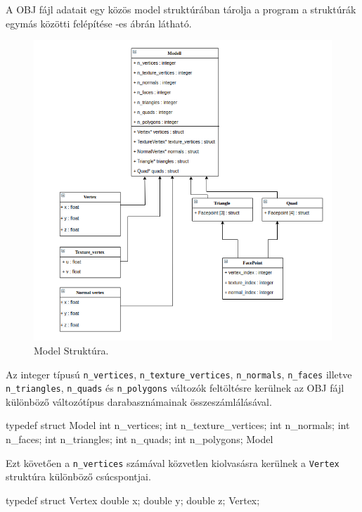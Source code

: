A OBJ fájl adatait egy közös model struktúrában tárolja a program a struktúrák egymás közötti felépítése -es ábrán látható.
\bigskip
\begin{figure}[h]
\centering
\includegraphics[width=\textwidth]{images/struct.png}
\caption{Model Struktúra.}
\label{fig:struct}
\end{figure}
\bigskip

Az integer típusú \texttt{n\_vertices}, \texttt{n\_texture\_vertices}, \texttt{n\_normals}, \texttt{n\_faces} illetve \texttt{n\_triangles}, \texttt{n\_quads} és \texttt{n\_polygons} változók feltöltésre kerülnek az OBJ fájl különböző változótípus darabasznámainak összeszámlálásával.
\begin{python}
typedef struct Model
{
    int n_vertices;
    int n_texture_vertices;
    int n_normals;
    int n_faces;
    int n_triangles;
    int n_quads;
    int n_polygons;
}Model
\end{python}
\bigskip

Ezt követően a \texttt{n\_vertices} számával közvetlen kiolvasásra kerülnek a \texttt{Vertex} struktúra különböző csúcspontjai.
\bigskip
\begin{python} 
typedef struct Vertex
{
    double x;
    double y;
    double z;
}Vertex;
\end{python}
\bigskip

